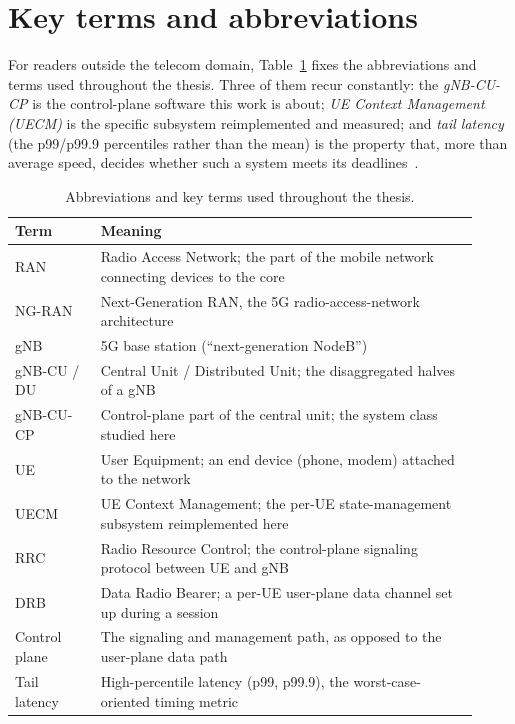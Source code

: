 \documentclass[english,twoside,openright,a4paper,censored,csm,software-track-2020]{HYthesisML}
\begin{document}
\section{Key terms and abbreviations}
For readers outside the telecom domain, Table~\ref{tab:abbrev} fixes the abbreviations and terms
used throughout the thesis. Three of them recur constantly: the \emph{gNB-CU-CP} is the
control-plane software this work is about; \emph{UE Context Management (UECM)} is the specific
subsystem reimplemented and measured; and \emph{tail latency} (the p99/p99.9 percentiles rather
than the mean) is the property that, more than average speed, decides whether such a system
meets its deadlines~\cite{dean2013tail,barroso2017microseconds}.

\begin{table}
\centering
\caption[Abbreviations and key terms]{Abbreviations and key terms used throughout the thesis.\label{tab:abbrev}}
\renewcommand{\arraystretch}{1.1}
\begin{tabular}{@{}p{0.17\linewidth} p{0.75\linewidth}@{}}
\hline\hline
Term & Meaning \\
\hline
RAN & Radio Access Network; the part of the mobile network connecting devices to the core \\
NG-RAN & Next-Generation RAN, the 5G radio-access-network architecture \\
gNB & 5G base station (``next-generation NodeB'') \\
gNB-CU / DU & Central Unit / Distributed Unit; the disaggregated halves of a gNB \\
gNB-CU-CP & Control-plane part of the central unit; the system class studied here \\
UE & User Equipment; an end device (phone, modem) attached to the network \\
UECM & UE Context Management; the per-UE state-management subsystem reimplemented here \\
RRC & Radio Resource Control; the control-plane signaling protocol between UE and gNB \\
DRB & Data Radio Bearer; a per-UE user-plane data channel set up during a session \\
Control plane & The signaling and management path, as opposed to the user-plane data path \\
Tail latency & High-percentile latency (p99, p99.9), the worst-case-oriented timing metric \\

\end{tabular}
\end{table}
\end{document}
